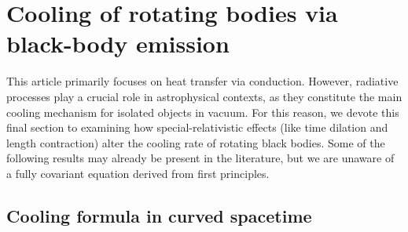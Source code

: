 \documentclass[a4paper, amsfonts, amssymb, amsmath, reprint, showkeys, nofootinbib, twoside, onecolumn,notitlepage]{revtex4-1}
\theoremstyle{definition}
\theoremstyle{theorem}
\begin{document}
\newpage
\section{Cooling of rotating bodies via black-body emission}

This article primarily focuses on heat transfer via conduction. However, radiative processes play a crucial role in astrophysical contexts, as they constitute the main cooling mechanism for isolated objects in vacuum. For this reason, we devote this final section to examining how special-relativistic effects (like time dilation and length contraction) alter the cooling rate of rotating black bodies. Some of the following results may already be present in the literature, but we are unaware of a fully covariant equation derived from first principles.

\subsection{Cooling formula in curved spacetime}
\end{document}
